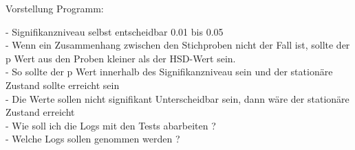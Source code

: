 Vorstellung Programm:

- Signifikanzniveau selbst entscheidbar 0.01 bis 0.05 \\
- Wenn ein Zusammenhang zwischen den Stichproben nicht der Fall ist, sollte der p Wert aus den Proben kleiner als der HSD-Wert sein.\\
- So sollte der p Wert innerhalb des Signifikanzniveau sein und der stationäre Zustand sollte erreicht sein\\
- Die Werte sollen nicht signifikant Unterscheidbar sein, dann wäre der stationäre Zustand erreicht\\
- Wie soll ich die Logs mit den Tests abarbeiten ?\\
- Welche Logs sollen genommen werden ? 
